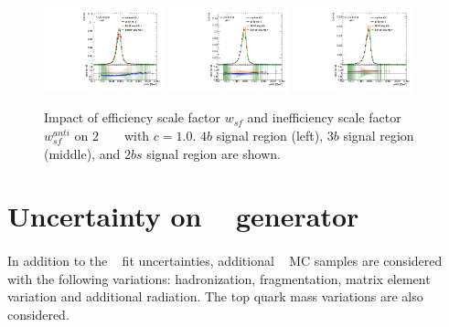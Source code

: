 \begin{figure}[htbp!]
\begin{center}
\includegraphics[width=0.31\textwidth,angle=-90]{figures/boosted/AppendixbSF/directcompare_mHH_l_bSF_2000_FT_EFF_Eigen_B_0__1down_TwoTag_split_.pdf}
\includegraphics[width=0.31\textwidth,angle=-90]{figures/boosted/AppendixbSF/directcompare_mHH_l_bSF_2000_FT_EFF_Eigen_B_0__1down_ThreeTag_.pdf}
\includegraphics[width=0.31\textwidth,angle=-90]{figures/boosted/AppendixbSF/directcompare_mHH_l_bSF_2000_FT_EFF_Eigen_B_0__1down_FourTag_.pdf}
\caption{Impact of efficiency scale factor $w_{sf}$ and inefficiency scale factor $w_{sf}^{anti}$ on $2$ \TeV~ \Grav~ with $c=1.0$. $4b$ signal region (left), $3b$ signal region (middle), and $2bs$ signal region are shown.}
\label{fig:signal_bsyst_reduction}
\end{center}
\end{figure}
\section{Uncertainty on \ttbar~ generator}
\label{sec:ttbar-mc-unc}

\paragraph{}
In addition to the \ttbar~ fit uncertainties, additional \ttbar~ MC samples are considered with the following variations: hadronization, fragmentation, matrix element variation and additional radiation.
The top quark mass variations are also considered. 

